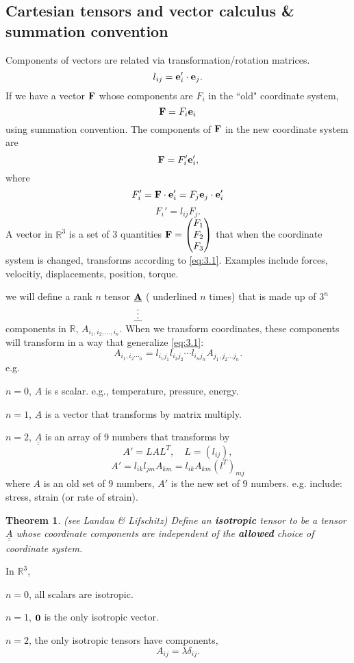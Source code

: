 \documentclass[12pt]{article}
\newtheorem{theorem}{Theorem}[section]
\newcommand{\ee}{{\bf e}}
\newcommand{\FF}{{\bf F}}
\newcommand{\bA}{{\bf A}}
\newcommand{\RR}{{\mathbb R}}
\newcommand{\mx}[1]{\begin{pmatrix}#1\end{pmatrix}}
\begin{document}
\subsection{Cartesian tensors and vector calculus \& summation convention}
 Components of vectors are related via transformation/rotation matrices.
\[
l_{ij} = \ee_i'\cdot\ee_j.
\]
If we have a vector $\FF$ whose components are $F_i$ in the ``old" coordinate system,
\[
\FF = F_i\ee_i
\]
using summation convention. The components of $\FF$ in the new coordinate system are
\[
\FF = F_i'\ee_i',
\]
where 
\[
F_i' = \FF\cdot\ee_i'= F_j\ee_j\cdot\ee_i'
\]
\begin{equation}\label{eq:3.1}
F_i' = l_{ij} F_j.
\end{equation}
A vector in $\RR^3$ is a set of 3 quantities $\FF = \mx{F_1\\F_2\\F_3}$ that when the coordinate system is changed, transforms according to \ref{eq:3.1}. Examples include forces, velocitiy, displacements, position, torque.

we will define a rank $n$ tensor $\underline{\underset{\vdots}{\underline\bA}}$ ( underlined $n$ times) that is made up of $3^n$ components in $\RR$, $A_{i_1, i_2, \dots,  i_n}$. When we transform coordinates, these components will transform in a way that generalize \ref{eq:3.1}:
\[
A_{i_1, i_2\dotsi_n} = l_{i_1j_1} l_{i_2j_2} \cdots l_{i_nj_n}A_{j_1, j_2\dots j_n}.
\]
e.g. 

$n=0$, $A$ is s scalar. e.g., temperature, pressure, energy.

$n=1$, $\underline A$ is a vector that transforms by matrix multiply.

$n=2$, $\underline{\underline A}$ is an array of 9 numbers that transforms by 
\[
A' = LAL^T, \quad L = (l_{ij}),
\]
\[
A' = l_{ik} l_{jm} A_{km} =  l_{ik} A_{km} (l^T)_{mj} 
\]
where $A$ is an old set of 9 numbers, $A'$ is the new set of 9 numbers. e.g. include: stress, strain (or rate of strain).

\begin{theorem} (see Landau \& Lifschitz)
Define an {\bf isotropic} tensor to be a tensor $\underline{\underline A}$ whose coordinate components are independent of the {\bf allowed} choice of coordinate system.
\end{theorem}
In $\RR^3$,

$n=0$, all scalars are isotropic.

$n=1$, $\bf 0$ is the only isotropic vector.

$n=2$, the only isotropic tensors have components, 
\[
A_{ij} = \lambda \delta_{ij}.
\]
\end{document}
